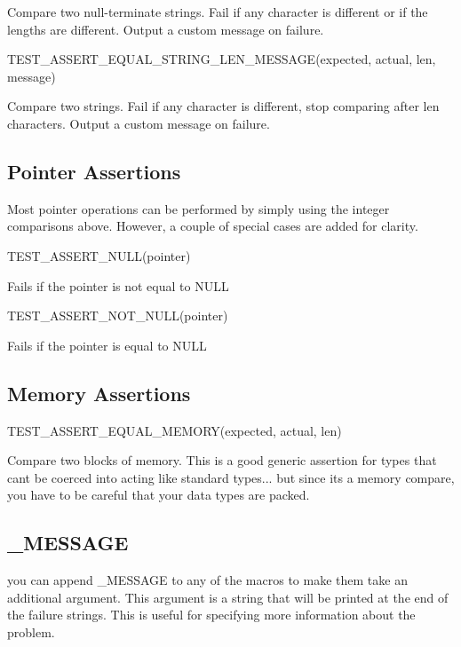 Compare two null-\/terminate strings. Fail if any character is different or if the lengths are different. Output a custom message on failure. \begin{DoxyVerb}TEST_ASSERT_EQUAL_STRING_LEN_MESSAGE(expected, actual, len, message)
\end{DoxyVerb}


Compare two strings. Fail if any character is different, stop comparing after len characters. Output a custom message on failure.

\subsection*{Pointer Assertions }

Most pointer operations can be performed by simply using the integer comparisons above. However, a couple of special cases are added for clarity. \begin{DoxyVerb}TEST_ASSERT_NULL(pointer)
\end{DoxyVerb}


Fails if the pointer is not equal to N\+U\+LL \begin{DoxyVerb}TEST_ASSERT_NOT_NULL(pointer)
\end{DoxyVerb}


Fails if the pointer is equal to N\+U\+LL

\subsection*{Memory Assertions }

\begin{DoxyVerb}TEST_ASSERT_EQUAL_MEMORY(expected, actual, len)
\end{DoxyVerb}


Compare two blocks of memory. This is a good generic assertion for types that can\textquotesingle{}t be coerced into acting like standard types... but since it\textquotesingle{}s a memory compare, you have to be careful that your data types are packed.

\subsection*{\+\_\+\+M\+E\+S\+S\+A\+GE }

you can append \+\_\+\+M\+E\+S\+S\+A\+GE to any of the macros to make them take an additional argument. This argument is a string that will be printed at the end of the failure strings. This is useful for specifying more information about the problem. 